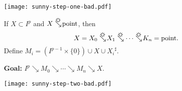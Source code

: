 \documentclass[14pt]{beamer}
\newcommand{\collapses}{\searrow}
\newcommand{\sunnycollapses}{\searrow\hspace{-12pt}\mbox{\raisebox{5pt}{\sun}}\hspace{2pt}}
\begin{document}
\begin{frame}
 \texttt{[image: sunny-step-one-bad.pdf]}
\end{frame}

\begin{frame}
  If $X \subset I^p$ and $X \sunnycollapses \mbox{point}$, then
$$
X = X_0 \sunnycollapses X_1 \sunnycollapses \cdots \sunnycollapses K_n
= \mbox{point}.
$$\pause
Define $M_i = \left(I^{p-1} \times \{0\}\right) \cup X \cup
{X_i}^\sharp$.

\vfill
\pause
\textbf{Goal: } $I^p \collapses M_0 \collapses \cdots \collapses M_n
\collapses X$.
\end{frame}

\begin{frame}
 \texttt{[image: sunny-step-two-bad.pdf]}
\end{frame}
\end{document}
